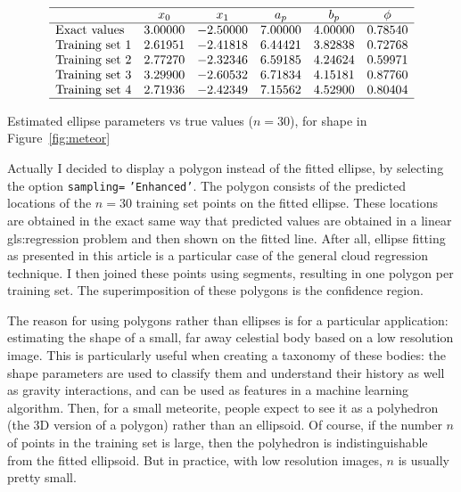 \documentclass[oneside,10pt]{book}
\renewcommand{\arraystretch}{1.4} %
\begin{document}
\renewcommand{\arraystretch}{1.2} %
\begin{table}[H]
\[
\begin{array}{lccccc}
\hline
   & x_0 & x_1  & a_p & b_p & \phi  \\
\hline
\text{Exact values} & 3.00000 & -2.50000 & 7.00000 & 4.00000 & 0.78540\\
\text{Training set } 1 & 2.61951 & -2.41818 & 6.44421 & 3.82838 & 0.72768 \\
\text{Training set } 2 & 2.77270 & -2.32346 & 6.59185 & 4.24624 & 0.59971 \\
\text{Training set } 3 & 3.29900 & -2.60532 & 6.71834 & 4.15181 & 0.87760 \\
\text{Training set } 4 & 2.71936 & -2.42349 & 7.15562 & 4.52900 & 0.80404 \\
\hline
\end{array}
\]
\caption{\label{ellipar} Estimated ellipse parameters vs true values ($n=30$), for shape in Figure~\ref{fig:meteor}}
\end{table}
\renewcommand{\arraystretch}{1.0} %

Actually I decided to display a polygon instead of the fitted ellipse, by selecting the option \texttt{sampling=} \texttt{'Enhanced'}. The polygon consists of the predicted locations of the $n=30$ training set points on the fitted ellipse. These locations are obtained in the exact same way that predicted values are obtained in a linear \gls{gls:regression} problem and then shown on the fitted line. After all, ellipse fitting as presented in this article is a particular case of the general cloud regression technique. I then joined these points using segments, resulting in one polygon per training set. The superimposition of these polygons is the confidence region.

The reason for using polygons rather than ellipses is for a particular application: estimating the shape of a small, far away celestial body based on a low resolution image.  This is particularly useful when creating a taxonomy of these bodies: the shape parameters are used to classify them and understand their history as well as gravity interactions, and can be used as features
 in a machine learning algorithm. Then, for a small meteorite, people expect to see it as a polyhedron (the 3D version of a polygon) rather than an ellipsoid. Of course, if the number $n$ of points in the training set is large, then the polyhedron is indistinguishable  from the fitted ellipsoid. But in practice, with low resolution images,  $n$ is usually pretty small.
\end{document}
